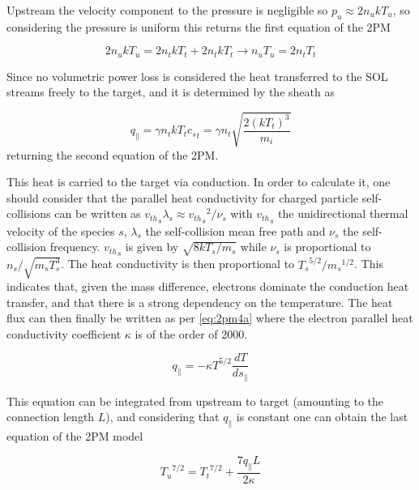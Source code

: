 Upstream the velocity component to the pressure is negligible so $p_u \approx 2 n_u k T_u$, so considering the pressure is uniform this returns the first equation of the 2PM

\begin{equation}
2 n_u k T_u = 2n_{t} k T_{t} + 2n_{t} k T_{t} \rightarrow n_u T_u = 2n_{t}T_{t}
\label{eq:2pm2}
\end{equation}

Since no volumetric power loss is considered the heat transferred to the SOL streams freely to the target, and it is determined by the sheath as

\begin{equation}
q_{\parallel} =  \gamma n_t k T_t {c_s}_t = \gamma n_t \sqrt{\frac{2(kT_t)^3}{m_i}}
\label{eq:2pm3}
\end{equation}
returning the second equation of the 2PM.

This heat is carried to the target via conduction. In order to calculate it, one should consider that the parallel heat conductivity for charged particle self-collisions can be written as ${v_{th}}_s \lambda_s \approx {{v_{th}}_s}^2/{\nu_s}$ with ${v_{th}}_s$ the unidirectional thermal velocity of the species $s$, $\lambda_s$ the self-collision mean free path and $\nu_s$ the self-collision frequency. ${v_{th}}_s$ is given by $\sqrt{8kT_s/{m_s}}$ while $\nu_s$ is proportional to $n_s/\sqrt{m_s T_s^3}$. The heat conductivity is then proportional to $ {T_s}^{5/2} / {m_s}^{1/2}$. This indicates that, given the mass difference, electrons dominate the conduction heat transfer, and that there is a strong dependency on the temperature. The heat flux can then finally be written as per \autoref{eq:2pm4a} where the electron parallel heat conductivity coefficient $\kappa$ is of the order of 2000.\cite{Stangeby2001}

\begin{equation}
q_{\parallel} = -\kappa T^{5/2} \frac{dT}{ds_{\parallel}}
\label{eq:2pm4a}
\end{equation}

This equation can be integrated from upstream to target (amounting to the connection length $L$), and considering that $q_{\parallel}$ is constant one can obtain the last equation of the 2PM model

\begin{equation}
{T_u}^{7/2} = {T_t}^{7/2} + \frac{7 q_{\parallel} L}{2 \kappa}
\label{eq:2pm4}
\end{equation}

